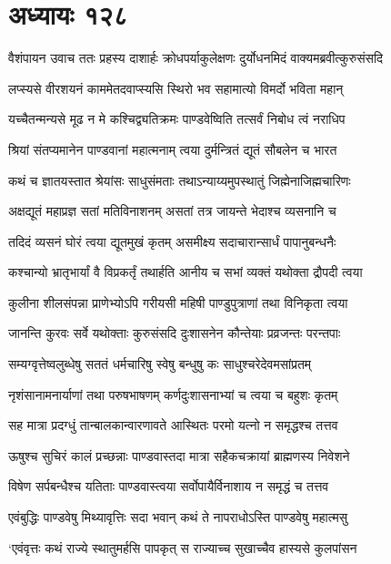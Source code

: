\chapter{अध्यायः १२८}
वैशंपायन उवाच
\twolineshloka
{ततः प्रहस्य दाशार्हः क्रोधपर्याकुलेक्षणः}
{दुर्योधनमिदं वाक्यमब्रवीत्कुरुसंसदि}


\twolineshloka
{लप्स्यसे वीरशयनं काममेतदवाप्स्यसि}
{स्थिरो भव सहामात्यो विमर्दो भविता महान्}


\twolineshloka
{यच्चैतन्मन्यसे मूढ न मे कश्चिद्व्यतिक्रमः}
{पाण्डवेष्विति तत्सर्वं निबोध त्वं नराधिप}


\twolineshloka
{श्रियां संतप्यमानेन पाण्डवानां महात्मनाम्}
{त्वया दुर्मन्त्रितं द्यूतं सौबलेन च भारत}


\twolineshloka
{कथं च ज्ञातयस्तात श्रेयांसः साधुसंमताः}
{तथाऽन्याय्यमुपस्थातुं जिह्मेनाजिह्मचारिणः}


\twolineshloka
{अक्षद्यूतं महाप्रज्ञ सतां मतिविनाशनम्}
{असतां तत्र जायन्ते भेदाश्च व्यसनानि च}


\twolineshloka
{तदिदं व्यसनं घोरं त्वया द्यूतमुखं कृतम्}
{असमीक्ष्य सदाचारान्सार्धं पापानुबन्धनैः}


\twolineshloka
{कश्चान्यो भ्रातृभार्यां वै विप्रकर्तृं तथार्हति}
{आनीय च सभां व्यक्तं यथोक्ता द्रौपदी त्वया}


\twolineshloka
{कुलीना शीलसंपन्ना प्राणेभ्योऽपि गरीयसी}
{महिषी पाण्डुपुत्राणां तथा विनिकृता त्वया}


\twolineshloka
{जानन्ति कुरवः सर्वे यथोक्ताः कुरुसंसदि}
{दुःशासनेन कौन्तेयाः प्रव्रजन्तः परन्तपाः}


\twolineshloka
{सम्यग्वृत्तेष्वलुब्धेषु सततं धर्मचारिषु}
{स्वेषु बन्धुषु कः साधुश्चरेदेवमसांप्रतम्}


\twolineshloka
{नृशंसानामनार्याणां तथा परुषभाषणम्}
{कर्णदुःशासनाभ्यां च त्वया च बहुशः कृतम्}


\twolineshloka
{सह मात्रा प्रदग्धुं तान्बालकान्वारणावते}
{आस्थितः परमो यत्नो न समृद्धश्च तत्तव}


\twolineshloka
{ऊषुश्च सुचिरं कालं प्रच्छन्नाः पाण्डवास्तदा}
{मात्रा सहैकचक्रायां ब्राह्मणस्य निवेशने}


\twolineshloka
{विषेण सर्पबन्धैश्च यतिताः पाण्डवास्त्वया}
{सर्वोपायैर्विनाशाय न समृद्धं च तत्तव}


\twolineshloka
{एवंबुद्धिः पाण्डवेषु मिथ्यावृत्तिः सदा भवान्}
{कथं ते नापराधोऽस्ति पाण्डवेषु महात्मसु}


\twolineshloka
{`एवंवृत्तः कथं राज्ये स्थातुमर्हसि पापकृत्}
{स राज्याच्च सुखाच्चैव हास्यसे कुलपांसन}


